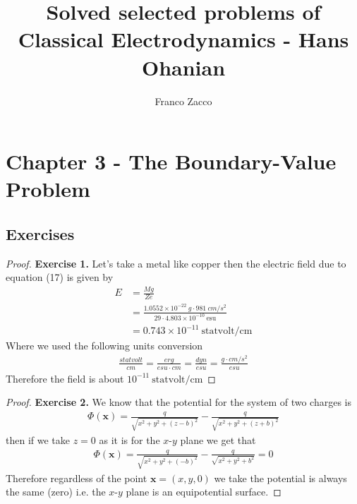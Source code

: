 \documentclass[11pt]{article}
\title{\textbf{Solved selected problems of Classical Electrodynamics - Hans Ohanian}}
\author{Franco Zacco}
\date{}
\theoremstyle{definition}
\begin{document}
\maketitle
\thispagestyle{empty}

\section*{Chapter 3 - The Boundary-Value Problem}

\subsection*{Exercises}

\begin{proof}{\textbf{Exercise 1.}}
    Let's take a metal like copper then the electric field due to equation
    (17) is given by
    \begin{align*}
        E &= \frac{Mg}{Ze}\\
        &= \frac{1.0552\times 10^{-22}~g \cdot 981~cm/s^2}
        {29 \cdot 4.803\times 10^{-10}~\text{esu}}\\
        &= 0.743 \times 10^{-11}~\text{statvolt/cm}
    \end{align*}
    Where we used the following units conversion
    \begin{align*}
        \frac{statvolt}{cm} = \frac{erg}{esu\cdot cm} = \frac{dyn}{esu}
        = \frac{g\cdot cm/s^2}{esu}
    \end{align*}
    Therefore the field is about $10^{-11}~\text{statvolt/cm}$
\end{proof}
\begin{proof}{\textbf{Exercise 2.}}
    We know that the potential for the system of two charges is 
    \begin{align*}
        \Phi(\bm{x}) = \frac{q}{\sqrt{x^2 + y^2 + (z -b)^2}}
        - \frac{q}{\sqrt{x^2 + y^2 + (z +b)^2}}
    \end{align*}
    then if we take $z=0$ as it is for the $x$-$y$ plane we get that
    \begin{align*}
        \Phi(\bm{x}) = \frac{q}{\sqrt{x^2 + y^2 + (-b)^2}}
        - \frac{q}{\sqrt{x^2 + y^2 + b^2}}
        = 0 
    \end{align*}
    Therefore regardless of the point $\bm{x} = (x,y,0)$ we take the potential
    is always the same (zero) i.e. the $x$-$y$ plane is an equipotential surface.
\end{proof}
\cleardoublepage
\end{document}
